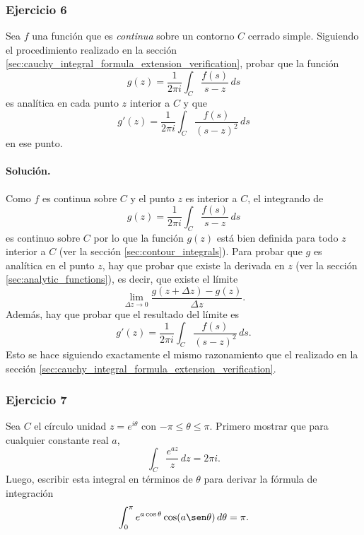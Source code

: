 \documentclass[a4paper]{report}
\begin{document}
\subsubsection*{Ejercicio 6}

Sea \(f\) una función que es \emph{continua} sobre un contorno \(C\) cerrado simple. Siguiendo el procedimiento realizado en la sección \ref{sec:cauchy_integral_formula_extension_verification}, probar que la función
\[
 g(z)=\frac{1}{2\pi i}\int_C\frac{f(s)}{s-z}\,ds
\]
es analítica en cada punto \(z\) interior a \(C\) y que 
\[
 g'(z)=\frac{1}{2\pi i}\int_C\frac{f(s)}{(s-z)^2}\,ds
\]
en ese punto.

\paragraph{Solución.} Como \(f\) es continua sobre \(C\) y el punto \(z\) es interior a \(C\), el integrando de
\[
 g(z)=\frac{1}{2\pi i}\int_C\frac{f(s)}{s-z}\,ds
\]
es continuo sobre \(C\) por lo que la función \(g(z)\) está bien definida para todo \(z\) interior a \(C\) (ver la sección \ref{sec:contour_integrals}). Para probar que \(g\) es analítica en el punto \(z\), hay que probar que existe la derivada en \(z\) (ver la sección \ref{sec:analytic_functions}), es decir, que existe el límite
\[
 \lim_{\Delta z\to0}\frac{g(z+\Delta z)-g(z)}{\Delta z}.
\]
Además, hay que probar que el resultado del límite es
\[
 g'(z)=\frac{1}{2\pi i}\int_C\frac{f(s)}{(s-z)^2}\,ds.
\]
Esto se hace siguiendo exactamente el mismo razonamiento que el realizado en la sección \ref{sec:cauchy_integral_formula_extension_verification}.

\subsubsection*{Ejercicio 7}

Sea \(C\) el círculo unidad \(z=e^{i\theta}\) con \(-\pi\leq\theta\leq\pi\). Primero mostrar que para cualquier constante real \(a\),
\[
 \int_C\frac{e^{az}}{z}\,dz=2\pi i.
\]
Luego, escribir esta integral en términos de \(\theta\) para derivar la fórmula de integración
\[
 \int_0^\pi e^{a\cos\theta}\cos(a\sen\theta)\,d\theta=\pi.
\]
\end{document}
